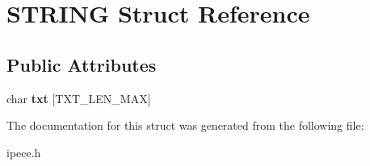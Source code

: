 \hypertarget{struct_s_t_r_i_n_g}{\section{S\-T\-R\-I\-N\-G Struct Reference}
\label{struct_s_t_r_i_n_g}
}
\subsection*{Public Attributes}
\begin{DoxyCompactItemize}
\item 
\hypertarget{struct_s_t_r_i_n_g_a0fbe69d24b05d81b9e53c7e24ff93dc9}{char {\bfseries txt} \mbox{[}T\-X\-T\-\_\-\-L\-E\-N\-\_\-\-M\-A\-X\mbox{]}}\label{struct_s_t_r_i_n_g_a0fbe69d24b05d81b9e53c7e24ff93dc9}

\end{DoxyCompactItemize}


The documentation for this struct was generated from the following file\-:\begin{DoxyCompactItemize}
\item 
ipece.\-h\end{DoxyCompactItemize}
